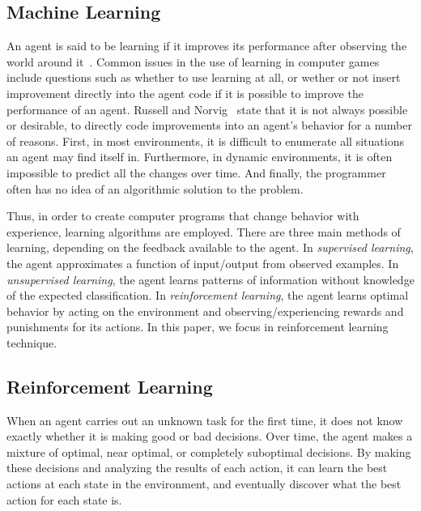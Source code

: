 \subsection{Machine Learning}
\label{subsec:machine-learning}

An agent is said to be learning if it improves its performance after observing the world around it~\cite{russell1995artificial}. 
Common issues in the use of learning in computer games include questions such as whether to use learning at all, or wether or not insert improvement directly into the agent code if it is possible to improve the performance of an agent. 
Russell and Norvig~\cite{russell1995artificial} state that it is not always possible or desirable, to directly code improvements into an agent's behavior for a number of reasons. First, in most environments, it is difficult to enumerate all situations an agent may find itself in. Furthermore, in dynamic environments, it is often impossible to predict all the changes over time. And finally, the programmer often has no idea of an algorithmic solution to the problem. 

Thus, in order to create computer programs that change behavior with experience, learning algorithms are employed. 
There are three main methods of learning, depending on the feedback available to the agent. 
In \emph{supervised learning}, the agent approximates a function of input/output from observed examples. 
In \emph{unsupervised learning}, the agent learns patterns of information without knowledge of the expected classification. 
In \emph{reinforcement learning}, the agent learns optimal behavior by acting on the environment and observing/experiencing rewards and punishments for its actions. 
In this paper, we focus in reinforcement learning technique. 



\subsection{Reinforcement Learning}
\label{subsec:rl}

When an agent carries out an unknown task for the first time, it does not know exactly whether it is making good or bad decisions. 
Over time, the agent makes a mixture of optimal, near optimal, or completely suboptimal decisions. 
By making these decisions and analyzing the results of each action, it can learn the best actions at each state in the environment, and eventually discover what the best action for each state is. 

